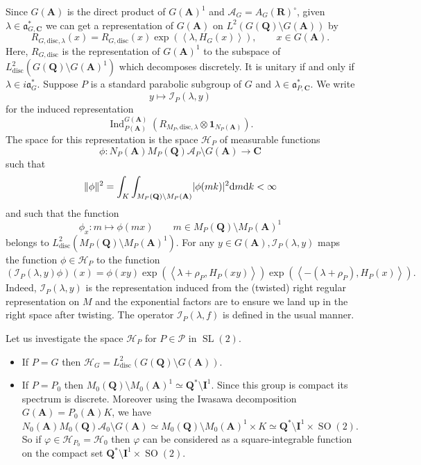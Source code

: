 \documentclass[11pt]{amsart}
\def\A{\mathbf A}
\def\C{\mathbf C}
\def\I{\mathbf I}
\def\Q{\mathbf Q}
\def\R{\mathbf R}
\def\AAA{\mathcal A}	%
\def\HHH{\mathcal H}
\def\III{\mathcal I}
\def\PPP{\mathcal P}
\def\aaa{\mathfrak a}
\def\cb#1{{\color{blue}#1}}
\def\d{\text d}
\def\bs{\setminus} 			%
\def\disc{\text{disc}}
\def\Ind{\operatorname{Ind}}
\def\Ltwo{L^2}
\def\mod#1{\lvert #1 \rvert} %
\def\norm#1{\Vert #1 \Vert} %
\def\sl{\operatorname{SL}}
\def\sprod#1#2{\left\langle #1 , #2 \right\rangle}  %
\theoremstyle{remark}
\begin{document}
Since $G(\A)$ is the direct product of $G(\A)^1$ and $\AAA_G = A_G(\R)^\circ$, given $\lambda \in \aaa_{G, \C}^*$ we can get a representation of $G(\A)$ on $\Ltwo(G(\Q) \bs G(\A))$ by
\[ R_{G, \disc, \lambda}(x) = R_{G, \disc}(x) \exp(\sprod{\lambda}{H_G(x)}), \qquad x \in G(\A). \]
Here, $R_{G, \disc}$ is the representation of $G(\A)^1$ to the subspace of $\Ltwo_\disc(G(\Q)\bs G(\A)^1)$ which decomposes discretely. It is unitary if and only if $\lambda \in i\aaa_G^*$. Suppose $P$ is a standard parabolic subgroup of $G$ and $\lambda \in \aaa_{P, \C}^*$. We write 
\[ y \mapsto \III_P(\lambda, y) \]
for the induced representation 
\[ \Ind_{P(\A)}^{G(\A)}(R_{M_P, \disc, \lambda} \otimes \mathbf 1_{N_P(\A)}). \]
The space for this representation is the space $\HHH_P$ of measurable functions
\[ \phi : N_P(\A)M_P(\Q)\AAA_P \bs G(\A) \to \C \]
such that 
\[ \norm{\phi}^2 = \int_K \int_{M_P(\Q)\bs M_P(\A)} \mod{\phi(mk)}^2 \d m \d k < \infty \]
and such that the function
\[ \phi_x : m \mapsto \phi(mx) \qquad m \in M_P(\Q)\bs M_P(\A)^1 \]
belongs to $\Ltwo_\disc(M_P(\Q) \bs M_P(\A)^1)$.
For any $y \in G(\A), \III_P(\lambda, y)$ maps the function $\phi \in \HHH_P$ to the function
\[ (\III_P(\lambda, y)\phi)(x) = \phi(xy) \exp(\sprod{\lambda + \rho_P}{H_P(xy)}) 
		\exp(\sprod{-(\lambda + \rho_P)}{H_P(x)}). \]
Indeed, $\III_P(\lambda, y)$ is the representation induced from the (twisted) right regular representation on $M$ and the exponential factors are to ensure we land up in the right space after twisting. The operator $\III_P(\lambda, f)$ is defined in the usual manner. \cb{Let us investigate the space $\HHH_P$ for $P \in \PPP$ in $\sl(2)$. 
\begin{itemize}
	\item If $P=G$ then $\HHH_G = \Ltwo_{\disc}(G(\Q)\bs G(\A))$. 
	\item If $P = P_0$ then $M_0(\Q)\bs M_0(\A)^1 \simeq \Q^* \bs \I^1$. 
		Since this group is compact its spectrum is discrete. Moreover using the Iwasawa decomposition $G(\A) = P_0(\A) K$, we have
		\[ N_0(\A)M_0(\Q)\AAA_0\bs G(\A) \simeq M_0(\Q)\bs M_0(\A)^1 \times K \simeq \Q^*\bs \I^1 \times \operatorname{SO}(2). \]
		So if $\varphi \in \HHH_{P_0} = \HHH_0$ then $\varphi$ can be considered as a square-integrable function on the compact set $\Q^*\bs \I^1 \times \operatorname{SO}(2)$. 
\end{itemize}
}
\end{document}
